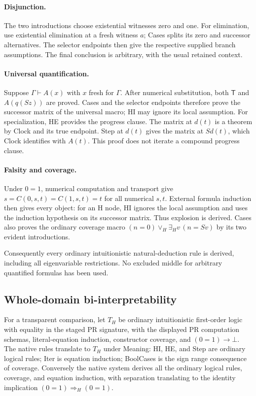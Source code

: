\paragraph{Disjunction.}
The two introductions choose existential witnesses zero and one.
For elimination, use existential elimination at a fresh witness $a$;
Cases splits its zero and successor alternatives.  The selector endpoints
then give the respective supplied branch assumptions.  The final
conclusion is arbitrary, with the usual retained context.

\paragraph{Universal quantification.}
Suppose $\Gamma\vdash A(x)$ with $x$ fresh for $\Gamma$.
After numerical substitution, both $\mathsf T$ and $A(q(Sz))$ are
proved.  Cases and the selector endpoints therefore prove the successor
matrix of the universal macro; HI may ignore its local assumption.
For specialization, HE provides the progress clause.  The matrix at
$d(t)$ is a theorem by Clock and its true endpoint.  Step at $d(t)$
gives the matrix at $Sd(t)$, which Clock identifies with $A(t)$.
This proof does not iterate a compound progress clause.

\paragraph{Falsity and coverage.}
Under $0=1$, numerical computation and transport give
$s=C(0,s,t)=C(1,s,t)=t$ for all numerical $s,t$.
External formula induction then gives every object: for an H node,
HI ignores the local assumption and uses the induction hypothesis on
its successor matrix.  Thus explosion is derived.  Cases also proves
the ordinary coverage macro
$(n=0)\vee_H\exists_H v\,(n=Sv)$ by its two evident introductions.

Consequently every ordinary intuitionistic natural-deduction rule is
derived, including all eigenvariable restrictions.  No excluded middle
for arbitrary quantified formulas has been used.

\subsection{Whole-domain bi-interpretability}

For a transparent comparison, let $T_H$ be ordinary intuitionistic
first-order logic with equality in the staged PR signature, with the
displayed PR computation schemas, literal-equation induction,
constructor coverage, and $(0=1)\to\bot$.  The native rules translate
to $T_H$ under Meaning: HI, HE, and Step are ordinary logical rules;
Iter is equation induction; BoolCases is the sign range consequence
of coverage.  Conversely the native
system derives all the ordinary logical rules, coverage, and equation
induction, with separation translating to the identity implication
$(0=1)\Rightarrow_H(0=1)$.

